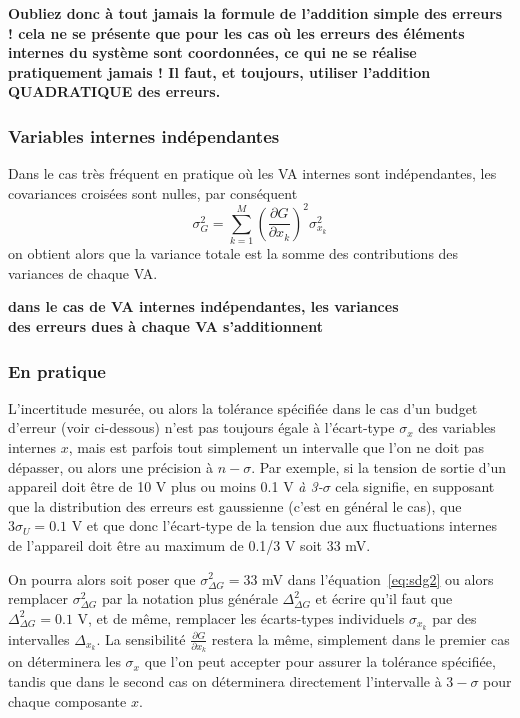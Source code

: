\documentclass[main.tex]{subfiles}
\begin{document}
\begin{center}
    \bf Oubliez donc à tout jamais la formule de l'addition simple des erreurs ! cela ne se présente que pour les cas où les erreurs des éléments internes du système sont coordonnées, ce qui ne se réalise pratiquement jamais ! Il faut, et toujours, utiliser l'addition QUADRATIQUE des erreurs.
\end{center}

\subsubsection{Variables internes indépendantes}

Dans le cas très fréquent en pratique où les VA internes sont indépendantes, les covariances croisées sont nulles, par conséquent
\begin{equation}
    \sigma^2_G=\sum\limits_{k=1}^{M}\left(\frac{\partial G}{\partial x_k}\right)^2\sigma_{x_k}^2
    \label{eq:vardlcolvisd}
\end{equation}
on obtient alors que la variance totale est la somme des contributions des variances de chaque VA.
\begin{center}
    \bf
    dans le cas de VA internes indépendantes, les variances\\
    des erreurs dues à chaque VA s'additionnent
\end{center}

\subsubsection{En pratique}

L'incertitude mesurée, ou alors la tolérance spécifiée dans le cas d'un budget d'erreur (voir ci-dessous) n'est pas toujours égale à l'écart-type $\sigma_x$ des variables internes $x$, mais est parfois tout simplement un intervalle que l'on ne doit pas dépasser, ou alors une précision à $n-\sigma$. Par exemple, si la tension de sortie d'un appareil doit être de 10 V plus ou moins 0.1 V \textit{à 3-$\sigma$} cela signifie, en supposant que la distribution des erreurs est gaussienne (c'est en général le cas), que $3\sigma_U=0.1$ V et que donc l'écart-type de la tension due aux fluctuations internes de l'appareil doit être au maximum de 0.1/3 V soit 33 mV.

On pourra alors soit poser que $\sigma^2_{\Delta G}=33$ mV dans l'équation~\ref{eq:sdg2} ou alors remplacer $\sigma^2_{\Delta G}$ par la notation plus générale $\Delta^2_{\Delta G}$ et écrire qu'il faut que $\Delta^2_{\Delta G}=0.1$ V, et de même, remplacer les écarts-types individuels $\sigma_{x_k}$ par des intervalles $\Delta_{x_k}$. La sensibilité $\frac{\partial G}{\partial x_k}$ restera la même, simplement dans le premier cas on déterminera les $\sigma_x$ que l'on peut accepter pour assurer la tolérance spécifiée, tandis que dans le second cas on déterminera directement l'intervalle à $3-\sigma$ pour chaque composante $x$.
\end{document}
